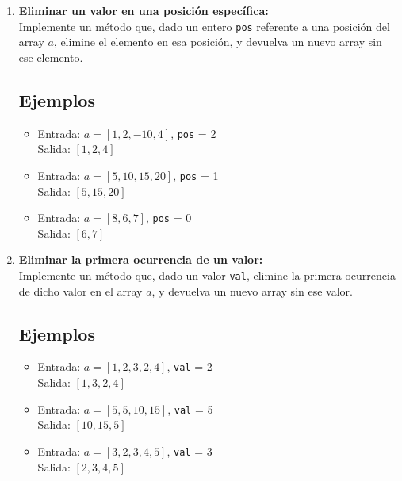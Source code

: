 \begin{enumerate}[label=\alph*)]
    \item \textbf{Eliminar un valor en una posición específica:} \\
    Implemente un método que, dado un entero \texttt{pos} referente a una posición del array \(a\), elimine el elemento en esa posición, y devuelva un nuevo array sin ese elemento.
    
    \subsection*{Ejemplos}
    \begin{itemize}
        \item Entrada: \(a = [1, 2, -10, 4]\), \texttt{pos} = 2 \\
        Salida: \([1, 2, 4]\)
        \item Entrada: \(a = [5, 10, 15, 20]\), \texttt{pos} = 1 \\
        Salida: \([5, 15, 20]\)
        \item Entrada: \(a = [8, 6, 7]\), \texttt{pos} = 0 \\
        Salida: \([6, 7]\)
    \end{itemize}

    \item \textbf{Eliminar la primera ocurrencia de un valor:} \\
    Implemente un método que, dado un valor \texttt{val}, elimine la primera ocurrencia de dicho valor en el array \(a\), y devuelva un nuevo array sin ese valor.
    
    \subsection*{Ejemplos}
    \begin{itemize}
        \item Entrada: \(a = [1, 2, 3, 2, 4]\), \texttt{val} = 2 \\
        Salida: \([1, 3, 2, 4]\)
        \item Entrada: \(a = [5, 5, 10, 15]\), \texttt{val} = 5 \\
        Salida: \([10, 15, 5]\)
        \item Entrada: \(a = [3, 2, 3, 4, 5]\), \texttt{val} = 3 \\
        Salida: \([2, 3, 4, 5]\)
    \end{itemize}
\end{enumerate}